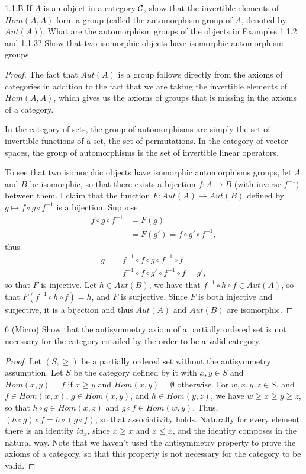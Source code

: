 \begin{exercise}{1.1.B}
If $A$ is an object in a category $\mathcal{C}$, show that the invertible elements of $Hom(A, A)$ form a group (called the automorphism group of $A$, denoted by $Aut(A)$).
What are the automorphism groups of the objects in Examples 1.1.2 and 1.1.3?
Show that two isomorphic objects have isomorphic automorphism groups.
\end{exercise}
\begin{proof}
The fact that $Aut(A)$ is a group follows directly from the axioms of categories in addition to the fact that we are taking the invertible elements of $Hom(A, A)$, which gives us the axioms of groups that is missing in the axioms of a category.

In the category of sets, the group of automorphisms are simply the set of invertible functions of a set, the set of permutations.
In the category of vector spaces, the group of automorphisms is the set of invertible linear operators.

To see that two isomorphic objects have isomorphic automorphisms groups, let $A$ and $B$ be isomorphic, so that there exists a bijection $f: A \to B$ (with inverse $f^{-1}$) between them.
I claim that the function $F: Aut(A) \to Aut(B)$ defined by $g \mapsto f \circ g \circ f^{-1}$ is a bijection.
Suppose 
\begin{align*}
    f \circ g \circ f^{-1}
    &= F(g)\\
    &= F(g') = f \circ g' \circ f^{-1},
\end{align*}
thus 
\begin{align*}
    g 
    =& f^{-1} \circ f \circ g \circ f^{-1} \circ f\\
    =& f^{-1} \circ f \circ g' \circ f^{-1} \circ f = g',
\end{align*}
so that $F$ is injective.
Let $h \in Aut(B)$, we have that $f^{-1} \circ h \circ f \in Aut(A)$, so that $F(f^{-1} \circ h \circ f) = h$, and $F$ is surjective.
Since $F$ is both injective and surjective, it is a bijection and thus $Aut(A)$ and $Aut(B)$ are isomorphic.
\end{proof} 

\begin{exercise}{6 (Micro)}
Show that the antisymmetry axiom of a partially ordered set is not necessary for the category entailed by the order to be a valid category.
\end{exercise}
\begin{proof}
Let $(S, \geq)$ be a partially ordered set without the antisymmetry assumption.
Let $S$ be the category defined by it with $x, y \in S$ and $Hom(x, y) = f$ if $x \geq y$ and $Hom(x, y) = \emptyset$ otherwise.
For $w, x, y, z \in S$, and $f \in Hom(w, x)$, $g \in Hom(x, y)$, and $h \in Hom(y, z)$, we have $w \geq x \geq y \geq z$, so that $h \circ g \in Hom(x, z)$ and $g \circ f \in Hom(w, y)$.
Thus, $(h \circ g) \circ f = h \circ (g \circ f)$, so that associativity holds.
Naturally for every element there is an identity $id_x$, since $x \geq x$ and $x \leq x$, and the identity composes in the natural way.
Note that we haven't used the antisymmetry property to prove the axioms of a category, so that this property is not necessary for the category to be valid.
\end{proof} 

